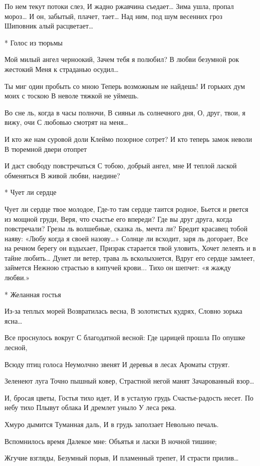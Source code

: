 По нем текут потоки слез,
И жадно ржавчина съедает…
Зима ушла, пропал мороз…
И он, забытый, плачет, тает…
Над ним, под шум весенних гроз
Шиповник алый расцветает…


* Голос из тюрьмы

Мой милый ангел черноокий,
Зачем тебя я полюбил?
В любви безумной рок жестокий
Меня к страданью осудил…

Ты миг один пробыть со мною
Теперь возможным не найдешь!
И горьких дум моих с тоскою
В неволе тяжкой не уймешь.

Во сне ль, когда в часы полночи,
В сияньи ль солнечного дня,
О, друг, твои, я вижу, очи
С любовью смотрят на меня…

И кто же нам суровой доли
Клеймо позорное сотрет?
И кто теперь замок неволи
В тюремной двери отопрет

И даст свободу повстречаться
С тобою, добрый ангел, мне
И теплой лаской обменяться
В живой любви, наедине?


* Чует ли сердце

Чует ли сердце твое молодое,
Где-то там сердце таится родное,
Бьется и рвется из мощной груди,
Веря, что счастье его впереди?
Где вы друг друга, когда повстречали?
Грезы ль волшебные, сказка ль, мечта ли?
Бредит красавец тобой наяву:
«Любу когда я своей назову…»
Солнце ли всходит, заря ль догорает,
Все на речном берегу он вздыхает,
Призрак старается твой уловить,
Хочет лелеять и в тайне любить…
Дунет ли ветер, трава ль всколыхнется,
Вдруг его сердце замлеет, займется
Нежною страстью в кипучей крови...
Тихо он шепчет: «я жажду любви.»


* Желанная гостья

Из-за теплых морей
Возвратилась весна,
В золотистых кудрях,
Словно зорька ясна…

Все проснулось вокруг
С благодатной весной:
Где царицей прошла
По опушке лесной,

Всюду птиц голоса
Неумолчно звенят
И деревья в лесах
Ароматы струят.

Зеленеют луга
Точно пышный ковер,
Страстной негой манят
Зачарованный взор…

И, бросая цветы,
Гостья тихо идет,
И в усталую грудь
Счастье-радость несет.
По небу тихо
Плывут облака
И дремлет уныло
У леса река.

Хмуро дымится
Туманная даль,
И в грудь заползает
Невольно печаль.

Вспомнилось время
Далекое мне:
Объятья и ласки
В ночной тишине;

Жгучие взгляды,
Безумный порыв,
И пламенный трепет,
И страсти прилив…

